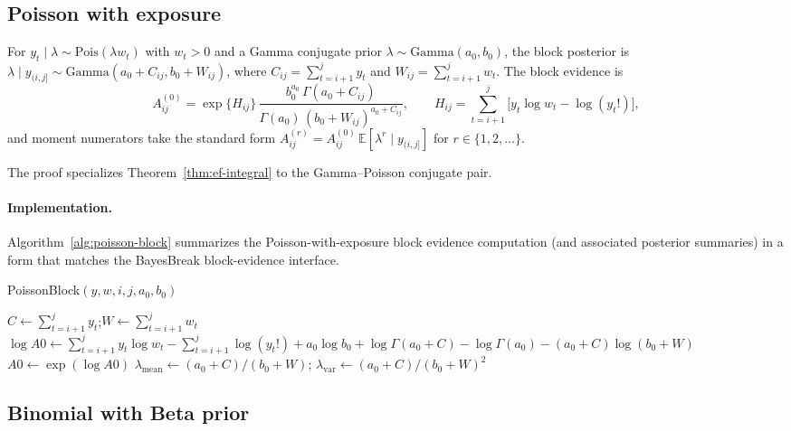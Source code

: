 \subsection{Poisson with exposure}
\label{sec:family-poisson}

\begin{proposition}
\label{prop:poisson-block}
For $y_t\mid\lambda\sim\mathrm{Pois}(\lambda w_t)$ with $w_t>0$ and a Gamma conjugate prior
$\lambda\sim\mathrm{Gamma}(a_0,b_0)$, the block posterior is
$\lambda\mid y_{(i,j]}\sim\mathrm{Gamma}(a_0+C_{ij},b_0+W_{ij})$, where
$C_{ij}=\sum_{t=i+1}^j y_t$ and $W_{ij}=\sum_{t=i+1}^j w_t$. The block evidence is
\[
A^{(0)}_{ij}
= \exp\{H_{ij}\}\,
\frac{b_0^{a_0}\,\Gamma(a_0+C_{ij})}{\Gamma(a_0)\,(b_0+W_{ij})^{a_0+C_{ij}}},
\qquad H_{ij}=\sum_{t=i+1}^j\big[y_t\log w_t-\log(y_t!)\big],
\]
and moment numerators take the standard form
$A^{(r)}_{ij}=A^{(0)}_{ij}\,\mathbb{E}[\lambda^r\mid y_{(i,j]}]$ for $r\in\{1,2,\dots\}$.
\end{proposition}

The proof specializes Theorem~\ref{thm:ef-integral} to the Gamma--Poisson conjugate pair.

\paragraph{Implementation.}
Algorithm~\ref{alg:poisson-block} summarizes the Poisson-with-exposure block evidence computation (and associated posterior summaries) in a form that matches the BayesBreak block-evidence interface.

\begin{algorithm}[H]
\caption{PoissonBlock$(y,w,i,j,a_0,b_0)$}
\label{alg:poisson-block}
\KwIn{Block $(i,j]$; counts $y_{i+1:j}$; exposures $w_{i+1:j}$}
$C\leftarrow \sum_{t=i+1}^j y_t$;\quad $W\leftarrow \sum_{t=i+1}^j w_t$\;
$\log A0 \leftarrow \sum_{t=i+1}^j y_t\log w_t
- \sum_{t=i+1}^j \log(y_t!)
+ a_0\log b_0
+ \log\Gamma(a_0+C)
- \log\Gamma(a_0)
- (a_0+C)\log(b_0+W)$\;
$A0\leftarrow \exp(\log A0)$\;
$\lambda_{\text{mean}}\leftarrow (a_0+C)/(b_0+W)$;\quad
$\lambda_{\text{var}}\leftarrow (a_0+C)/(b_0+W)^2$\;
\end{algorithm}

\subsection{Binomial with Beta prior}
\label{sec:family-binomial}

